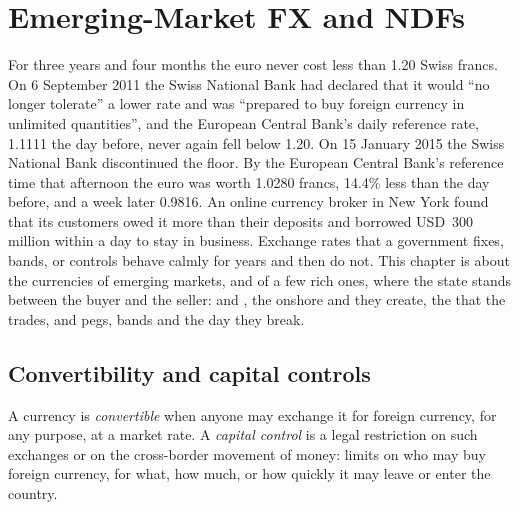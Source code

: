 \chapter{Emerging-Market FX and NDFs}\label{ch:m2:emerging-market-fx-and-ndfs}

For three years and four months the euro never cost less than 1.20 Swiss
francs. On 6 September 2011 the Swiss National Bank had declared that it would
``no longer tolerate'' a lower rate and was ``prepared to buy foreign currency in
unlimited quantities'', and the European Central Bank's daily reference rate,
1.1111 the day before, never again fell below 1.20. On 15 January
2015 the Swiss National Bank discontinued the floor. By the European Central
Bank's reference time that afternoon the euro was worth 1.0280 francs, 14.4\%
less than the day before, and a week later 0.9816. An online currency broker in
New York found that its customers owed it more than their deposits and borrowed
USD~300 million within a day to stay in business. Exchange rates that a
government fixes, bands, or controls behave calmly for years and then do not.
This chapter is about the currencies of emerging markets, and of a few rich
ones, where the state stands between the buyer and the seller: 
and , the onshore and  they create, the
 that the  trades, and pegs, bands and the
day they break.

\section{Convertibility and capital controls}

\begin{definition}\label{def:m2:emerging-market-fx-and-ndfs:controls}
A currency is \emph{convertible} when anyone may exchange
it for foreign currency, for any purpose, at a market rate. A \emph{capital
control} is a legal restriction on such exchanges or on
the cross-border movement of money: limits on who may buy foreign currency, for
what, how much, or how quickly it may leave or enter the country.
\end{definition}

